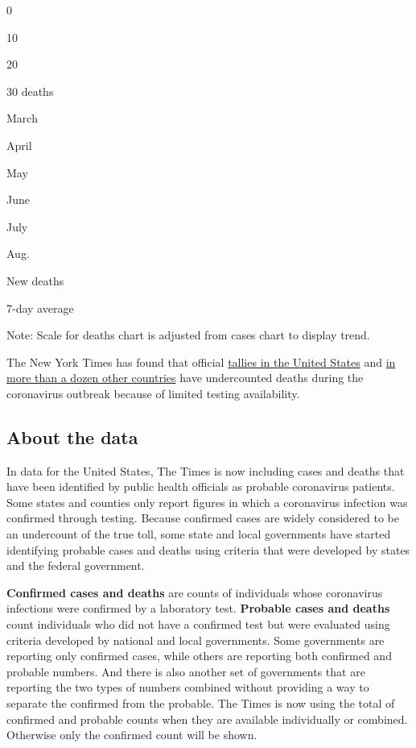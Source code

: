 0

10

20

30 deaths

March

April

May

June

July

Aug.

New deaths

7-day average

Note: Scale for deaths chart is adjusted from cases chart to display
trend.

The New York Times has found that official
\href{https://www.nytimes.com/interactive/2020/04/28/us/coronavirus-death-toll-total.html}{tallies
in the United States} and
\href{https://www.nytimes.com/interactive/2020/04/21/world/coronavirus-missing-deaths.html}{in
more than a dozen other countries} have undercounted deaths during the
coronavirus outbreak because of limited testing availability.

\hypertarget{about-the-data}{%
\subsection{About the data}\label{about-the-data}}

In data for the United States, The Times is now including cases and
deaths that have been identified by public health officials as probable
coronavirus patients. Some states and counties only report figures in
which a coronavirus infection was confirmed through testing. Because
confirmed cases are widely considered to be an undercount of the true
toll, some state and local governments have started identifying probable
cases and deaths using criteria that were developed by states and the
federal government.

\textbf{Confirmed cases and deaths} are counts of individuals whose
coronavirus infections were confirmed by a laboratory test.
\textbf{Probable cases and deaths} count individuals who did not have a
confirmed test but were evaluated using criteria developed by national
and local governments. Some governments are reporting only confirmed
cases, while others are reporting both confirmed and probable numbers.
And there is also another set of governments that are reporting the two
types of numbers combined without providing a way to separate the
confirmed from the probable. The Times is now using the total of
confirmed and probable counts when they are available individually or
combined. Otherwise only the confirmed count will be shown.


